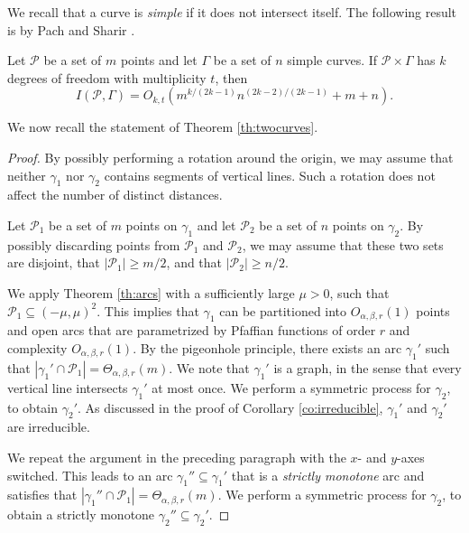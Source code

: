 \documentclass[11pt]{article}
\theoremstyle{definition}
\newcommand{\parag}[1]{\vspace{2mm}
\noindent{\bf #1} }
\newcommand{\pts}{\mathcal{P}}
\newcommand{\curves}{\Gamma}
\begin{document}
We recall that a curve is \emph{simple} if it does not intersect itself. 
The following result is by Pach and Sharir \cite{PS98}.

\begin{theorem} \label{th:PachSharir}
Let $\pts$ be a set of $m$ points and let $\curves$ be a set of $n$ simple curves. 
If $\pts \times \curves$ has $k$ degrees of freedom with multiplicity $t$, then
%
\[ I(\pts,\curves) = O_{k,t} \left(m^{k/(2k-1)}n^{(2k-2)/(2k-1)}+m+n\right). \]
%
\end{theorem}

We now recall the statement of Theorem \ref{th:twocurves}.


\begin{proof}
By possibly performing a rotation around the origin, we may assume that neither $\gamma_1$ nor $\gamma_2$ contains segments of vertical lines.
Such a rotation does not affect the number of distinct distances.

\parag{Pruning the point sets.} 
Let $\pts_1$ be a set of $m$ points on $\gamma_1$ and let $\pts_2$ be a set of $n$ points on $\gamma_2$. 
By possibly discarding points from $\pts_1$ and $\pts_2$, we may assume that these two sets are disjoint, that $|\pts_1|\ge m/2$, and that $|\pts_2|\ge n/2$.

We apply Theorem \ref{th:arcs} with a sufficiently large $\mu>0$, such that $\pts_1\subseteq (-\mu,\mu)^2$.
This implies that $\gamma_1$ can be partitioned into $O_{\alpha,\beta,r}(1)$ points and open arcs that are parametrized by Pfaffian functions of order $r$ and complexity $O_{\alpha,\beta,r}(1)$. 
By the pigeonhole principle, there exists an arc $\gamma_1'$ such that $|\gamma_1' \cap \pts_1| = \Theta_{\alpha,\beta,r}(m)$.
We note that $\gamma_1'$ is a graph, in the sense that every vertical line intersects $\gamma_1'$ at most once.
We perform a symmetric process for $\gamma_2$, to obtain $\gamma_2'$. 
As discussed in the proof of Corollary \ref{co:irreducible}, $\gamma_1'$ and $\gamma_2'$ are irreducible.

We repeat the argument in the preceding paragraph with the $x$- and $y$-axes switched. 
This leads to an arc $\gamma_1''\subseteq \gamma_1'$ that is a \emph{strictly monotone} arc and satisfies that $|\gamma_1'' \cap \pts_1| = \Theta_{\alpha,\beta,r}(m)$.
We perform a symmetric process for $\gamma_2$, to obtain a strictly monotone $\gamma_2'' \subseteq \gamma_2'$. 


\end{proof}
\end{document}
